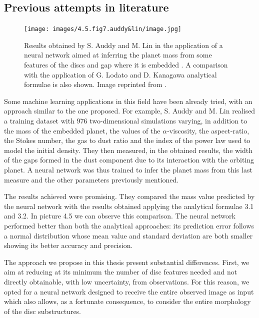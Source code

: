 \documentclass[a4paper,10pt]{report}
\begin{document}
\subsection{Previous attempts in literature}

\begin{figure}
    \begin{center}
        \texttt{[image: images/4.5.fig7.auddy\&lin/image.jpg]}
    \end{center}
    \caption{Results obtained by S. Auddy and M. Lin in the application
    of a neural network aimed at inferring the planet mass from some features of the discs
    and gap where it is embedded \cite{Auddy_2020}. A comparison with the application of G. Lodato \cite{Lodato_2019} and 
    D. Kanagawa \cite{kanagawa} analytical formulae is also shown.
    Image reprinted from \cite{Auddy_2020}.}
\end{figure}

Some machine learning applications in this field have been already tried, 
with an approach similar to the one proposed. For example,
S. Auddy and M. Lin \cite{Auddy_2020} realised a training dataset with 976 two-dimensional simulations varying, in addition to the mass of the embedded planet, the values of the $\alpha$-viscosity, the aspect-ratio, the Stokes number, the gas to dust ratio and the index of the power law used to model 
the initial density. 
They then measured, in the obtained results, the width of the gaps formed in the
dust component due to its interaction with the orbiting planet. A neural network
was thus trained to infer the planet mass from this last measure and the other parameters previously mentioned.

The results achieved were promising. They compared the mass value predicted by the neural network
with the results obtained applying the analytical formulae 3.1 and 3.2.
In picture 4.5 we can observe this comparison.
The neural network performed better than both the analytical approaches: its prediction error
follows a normal distribution whose mean value and standard deviation are both smaller showing its
better accuracy and precision.

The approach we propose in this thesis present substantial differences. 
First, we aim at reducing at its minimum the number of disc features needed and not 
directly obtainable, with low uncertainty, from observations.
For this reason, we opted for a neural network designed to receive the entire
observed image as input which also allows, as a fortunate consequence, to consider the entire morphology of the disc substructures.
\end{document}
